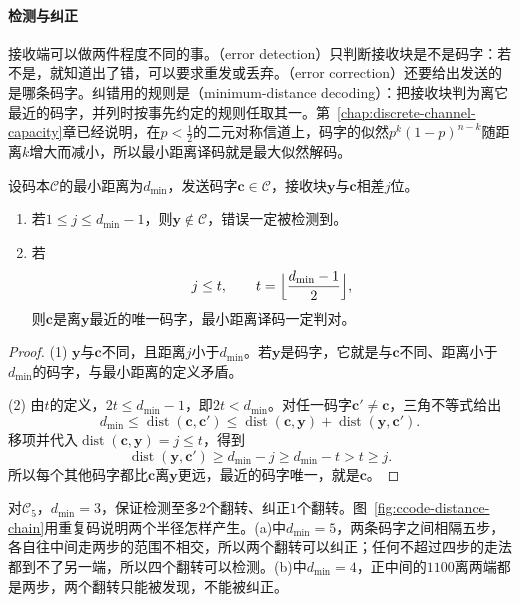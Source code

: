 \paragraph{检测与纠正}
接收端可以做两件程度不同的事。（error detection）只判断接收块是不是码字：若不是，就知道出了错，可以要求重发或丢弃。（error correction）还要给出发送的是哪条码字。纠错用的规则是（minimum-distance decoding）：把接收块判为离它最近的码字，并列时按事先约定的规则任取其一。第~\ref{chap:discrete-channel-capacity}章已经说明，在$p<\tfrac12$的二元对称信道上，码字的似然$p^{k}(1-p)^{n-k}$随距离$k$增大而减小，所以最小距离译码就是最大似然解码。

\begin{theorem}[最小距离的保证]
\label{thm:ccode-detect-correct}
设码本$\mathcal{C}$的最小距离为$d_{\min}$，发送码字$\bm{c}\in\mathcal{C}$，接收块$\bm{y}$与$\bm{c}$相差$j$位。
\begin{enumerate}
 \item 若$1\leq j\leq d_{\min}-1$，则$\bm{y}\notin\mathcal{C}$，错误一定被检测到。
 \item 若
 \begin{equation}
  j\leq t,\qquad t=\Bigl\lfloor\frac{d_{\min}-1}{2}\Bigr\rfloor ,
  \label{eq:ccode-correct-radius}
 \end{equation}
 则$\bm{c}$是离$\bm{y}$最近的唯一码字，最小距离译码一定判对。
\end{enumerate}
\end{theorem}

\begin{proof}
(1) $\bm{y}$与$\bm{c}$不同，且距离$j$小于$d_{\min}$。若$\bm{y}$是码字，它就是与$\bm{c}$不同、距离小于$d_{\min}$的码字，与最小距离的定义矛盾。

(2) 由$t$的定义，$2t\leq d_{\min}-1$，即$2t<d_{\min}$。对任一码字$\bm{c}'\neq\bm{c}$，三角不等式给出
\[
 d_{\min}\leq\operatorname{dist}(\bm{c},\bm{c}')\leq\operatorname{dist}(\bm{c},\bm{y})+\operatorname{dist}(\bm{y},\bm{c}') .
\]
移项并代入$\operatorname{dist}(\bm{c},\bm{y})=j\leq t$，得到
\[
 \operatorname{dist}(\bm{y},\bm{c}')\geq d_{\min}-j\geq d_{\min}-t>t\geq j .
\]
所以每个其他码字都比$\bm{c}$离$\bm{y}$更远，最近的码字唯一，就是$\bm{c}$。
\end{proof}

对$\mathcal{C}_5$，$d_{\min}=3$，保证检测至多$2$个翻转、纠正$1$个翻转。图~\ref{fig:ccode-distance-chain}用重复码说明两个半径怎样产生。(a)中$d_{\min}=5$，两条码字之间相隔五步，各自往中间走两步的范围不相交，所以两个翻转可以纠正；任何不超过四步的走法都到不了另一端，所以四个翻转可以检测。(b)中$d_{\min}=4$，正中间的$1100$离两端都是两步，两个翻转只能被发现，不能被纠正。

